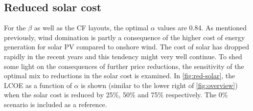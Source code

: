 \documentclass[a4paper, 5p, sort&compress]{elsarticle}%
\begin{document}
%

\subsection{Reduced solar cost}
\label{sec:reduced-solar-cost}

For the $\beta$ as well as the CF layouts, the optimal $\alpha$ values are
0.84. As mentioned previously, wind domination is partly a consequence
of the higher cost of energy generation for solar PV compared to
onshore wind. The cost of solar has dropped rapidly in the recent
years and this tendency might very well continue. To shed some light
on the consequences of further price reductions, the sensitivity of
the optimal mix to reductions in the solar cost is examined. In
\cref{fig:red-solar}, the LCOE as a function of $\alpha$ is shown (similar
to the lower right of \cref{fig:overview}) when the solar cost is
reduced by 25\%, 50\% and 75\% respectively. The 0\% scenario is
included as a reference.
\end{document}
